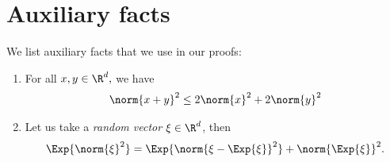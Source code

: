 \documentclass{article}
\begin{document}
\newpage

\section{Auxiliary facts}
We list auxiliary facts that we use in our proofs:
\begin{enumerate}
    \item 
        For all $x, y \in \R^d,$ we have
        \begin{align}
            \norm{x + y}^2 \leq 2\norm{x}^2 + 2\norm{y}^2
            \label{auxiliary:jensen_inequality}
        \end{align}
    \item
        Let us take a \textit{random vector} $\xi \in \R^d$, then
        \begin{align}
            \Exp{\norm{\xi}^2} = \Exp{\norm{\xi - \Exp{\xi}}^2} + \norm{\Exp{\xi}}^2.
            \label{auxiliary:variance_decomposition}
        \end{align}
\end{enumerate}
\end{document}
